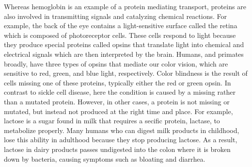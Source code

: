 Whereas hemoglobin is an example of a protein mediating transport, proteins are also involved in transmitting signals and catalyzing chemical reactions. For example, the back of the eye contains a light-sensitive surface called the retina which is composed of photoreceptor cells. These cells respond to light because they produce special proteins called opsins that translate light into chemical and electrical signals which are then interpreted by the brain. Humans, and primates broadly, have three types of opsins that mediate our color vision, which are sensitive to red, green, and blue light, respectively. Color blindness is the result of cells missing one of these proteins, typically either the red or green opsin. In contrast to sickle cell disease, here the condition is caused by a missing rather than a mutated protein. However, in other cases, a protein is not missing or mutated, but instead not produced at the right time and place. For example, lactose is a sugar found in milk that requires a secific protein, lactase, to metabolize properly. Many humans who can digest milk products in childhood, lose this ability in adulthood because they stop producing lactose. As a result, lactose in dairy products passes undigested into the colon where it is broken down by bacteria, causing symptoms such as bloating and diarrhea.


